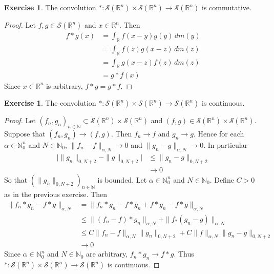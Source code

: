 \documentclass{book}
\theoremstyle{definition}
\newtheorem{ex}[definition]{Exercise}
\newcommand{\al}{\alpha}
\newcommand{\N}{\mathbb{N}}
\newcommand{\R}{\mathbb{R}}
\newcommand{\MS}{\mathcal{S}}
\DeclareMathOperator*{\0}{\mbf{0}}
\DeclareMathOperator*{\1}{\mbf{1}}
\newcommand{\dm}{\, d m}
\begin{document}
	\begin{ex}
		The convolution $*: \MS(\R^n) \times \MS(\R^n) \rightarrow \MS(\R^n)$ is commutative.
	\end{ex}
	
	\begin{proof}
		Let $f,g \in \MS(\R^n)$ and $x \in \R^n$. Then 
		\begin{align*}
			f*g(x)
			& = \int_{\R} f(x-y)g(y) \dm(y) \\
			& = \int_{\R} f(z)g(x-z) \dm(z) \\
			& = \int_{\R} g(x-z)f(z) \dm(z) \\
			& = g*f(x) 
		\end{align*}
		Since $x \in \R^n$ is arbitrary, $f*g = g*f$.
	\end{proof}

	\begin{ex}
		The convolution $*: \MS(\R^n) \times \MS(\R^n) \rightarrow \MS(\R^n)$ is continuous.
	\end{ex}

	\begin{proof}
		Let $(f_n,g_n)_{n \in \N} \subset \MS(\R^n) \times \MS(\R^n)$ and $(f,g) \in \MS(\R^n) \times \MS(\R^n)$. Suppose that $(f_n, g_n) \rightarrow (f,g)$. Then $f_n \rightarrow f$ and $g_n \rightarrow g$. Hence for each $\al \in \N_0^n$ and $N \in \N_0$, $\|f_n - f\|_{\al, N} \rightarrow 0$ and $\|g_n - g\|_{\al, N} \rightarrow 0$. In particular 
		\begin{align*}
			\bigg|\|g_n\|_{0,N+2} - \|g\|_{0, N+2} \bigg| 
			& \leq \|g_n - g\|_{0, N+2}  \\
			& \rightarrow 0
		\end{align*}
		So that $(\|g_n\|_{0,N+2})_{n \in \N}$ is bounded.
		Let $\al \in \N_0^n$ and $N \in \N_0$. Define $C >0$ as in the previous exercise. Then 
		\begin{align*}
			\|f_n *g_n - f*g\|_{\al,N} 
			& = \|f_n *g_n - f*g_n + f*g_n - f*g\|_{\al,N} \\ 
			& \leq \|(f_n -f )*g_n\|_{\al,N} + \|f_ *(g_n -g)\|_{\al,N} \\
			& \leq C\|f_n -f\|_{\al,N}\|g_n\|_{0, N+2} + C\|f\|_{\al,N}\|g_n-g\|_{0, N+2} \\
			& \rightarrow 0
		\end{align*}
		Since $\al \in \N_0^n$ and $N \in \N_0$ are arbitrary, $f_n *g_n \rightarrow f*g$. Thus $*:\MS(\R^n) \times \MS(\R^n) \rightarrow \MS(\R^n)$ is continuous.
	\end{proof}
\end{document}
